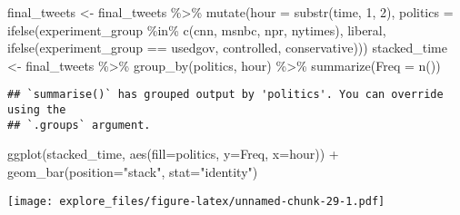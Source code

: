 \documentclass[
]{article}
\newenvironment{Shaded}{\begin{snugshade}}{\end{snugshade}}
\newcommand{\AttributeTok}[1]{\textcolor[rgb]{0.77,0.63,0.00}{#1}}
\newcommand{\DecValTok}[1]{\textcolor[rgb]{0.00,0.00,0.81}{#1}}
\newcommand{\FunctionTok}[1]{\textcolor[rgb]{0.00,0.00,0.00}{#1}}
\newcommand{\NormalTok}[1]{#1}
\newcommand{\OtherTok}[1]{\textcolor[rgb]{0.56,0.35,0.01}{#1}}
\newcommand{\SpecialCharTok}[1]{\textcolor[rgb]{0.00,0.00,0.00}{#1}}
\newcommand{\StringTok}[1]{\textcolor[rgb]{0.31,0.60,0.02}{#1}}
\begin{document}
\begin{Shaded}
\begin{Highlighting}[]
\NormalTok{final\_tweets }\OtherTok{\textless{}{-}}\NormalTok{ final\_tweets }\SpecialCharTok{\%\textgreater{}\%} 
  \FunctionTok{mutate}\NormalTok{(}\AttributeTok{hour =} \FunctionTok{substr}\NormalTok{(time, }\DecValTok{1}\NormalTok{, }\DecValTok{2}\NormalTok{), }
         \AttributeTok{politics =} \FunctionTok{ifelse}\NormalTok{(experiment\_group }\SpecialCharTok{\%in\%} \FunctionTok{c}\NormalTok{(}\StringTok{\textquotesingle{}cnn\textquotesingle{}}\NormalTok{, }\StringTok{\textquotesingle{}msnbc\textquotesingle{}}\NormalTok{, }\StringTok{\textquotesingle{}npr\textquotesingle{}}\NormalTok{, }\StringTok{\textquotesingle{}nytimes\textquotesingle{}}\NormalTok{), }\StringTok{\textquotesingle{}liberal\textquotesingle{}}\NormalTok{, }
                           \FunctionTok{ifelse}\NormalTok{(experiment\_group }\SpecialCharTok{==} \StringTok{\textquotesingle{}usedgov\textquotesingle{}}\NormalTok{, }\StringTok{\textquotesingle{}controlled\textquotesingle{}}\NormalTok{, }\StringTok{\textquotesingle{}conservative\textquotesingle{}}\NormalTok{)))}
\NormalTok{stacked\_time }\OtherTok{\textless{}{-}}\NormalTok{ final\_tweets }\SpecialCharTok{\%\textgreater{}\%} \FunctionTok{group\_by}\NormalTok{(politics, hour) }\SpecialCharTok{\%\textgreater{}\%} \FunctionTok{summarize}\NormalTok{(}\AttributeTok{Freq =} \FunctionTok{n}\NormalTok{())}
\end{Highlighting}
\end{Shaded}

\begin{verbatim}
## `summarise()` has grouped output by 'politics'. You can override using the
## `.groups` argument.
\end{verbatim}

\begin{Shaded}
\begin{Highlighting}[]
\FunctionTok{ggplot}\NormalTok{(stacked\_time, }\FunctionTok{aes}\NormalTok{(}\AttributeTok{fill=}\NormalTok{politics, }\AttributeTok{y=}\NormalTok{Freq, }\AttributeTok{x=}\NormalTok{hour)) }\SpecialCharTok{+} 
    \FunctionTok{geom\_bar}\NormalTok{(}\AttributeTok{position=}\StringTok{"stack"}\NormalTok{, }\AttributeTok{stat=}\StringTok{"identity"}\NormalTok{)}
\end{Highlighting}
\end{Shaded}

\texttt{[image: explore\_files/figure-latex/unnamed-chunk-29-1.pdf]}
\end{document}
